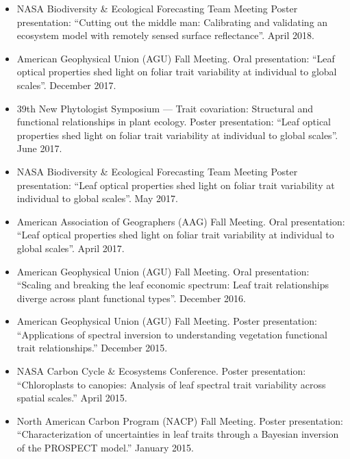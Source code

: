 \begin{itemize}
  \item NASA Biodiversity \& Ecological Forecasting Team Meeting
    Poster presentation: ``Cutting out the middle man: Calibrating and validating an ecosystem model with remotely sensed surface reflectance''.
    April 2018.

  \item American Geophysical Union (AGU) Fall Meeting.
    Oral presentation: ``Leaf optical properties shed light on foliar trait variability at individual to global scales''.
    December 2017.

  \item 39th New Phytologist Symposium --- Trait covariation: Structural and functional relationships in plant ecology.
    Poster presentation: ``Leaf optical properties shed light on foliar trait variability at individual to global scales''.
    June 2017.

  \item NASA Biodiversity \& Ecological Forecasting Team Meeting
    Poster presentation: ``Leaf optical properties shed light on foliar trait variability at individual to global scales''.
    May 2017.

  \item American Association of Geographers (AAG) Fall Meeting.
    Oral presentation: ``Leaf optical properties shed light on foliar trait variability at individual to global scales''.
    April 2017.

  \item American Geophysical Union (AGU) Fall Meeting.
    Oral presentation: ``Scaling and breaking the leaf economic spectrum: Leaf trait relationships diverge across plant functional types''.
    December 2016.

  \item American Geophysical Union (AGU) Fall Meeting. 
    Poster presentation: ``Applications of spectral inversion to understanding vegetation functional trait relationships.''
    December 2015.

  \item NASA Carbon Cycle \& Ecosystems Conference. 
    Poster presentation: ``Chloroplasts to canopies: Analysis of leaf spectral trait variability across spatial scales.'' 
    April 2015.

  \item North American Carbon Program (NACP) Fall Meeting. 
    Poster presentation: ``Characterization of uncertainties in leaf traits through a Bayesian inversion of the PROSPECT model.'' 
    January 2015.
\end{itemize}


